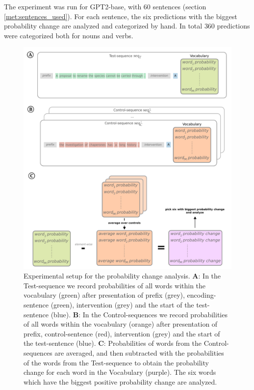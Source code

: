 The experiment was run for GPT2-base, with $60$ sentences (section \ref{met:sentences_used}).
For each sentence, the six predictions with the biggest probability change are analyzed and categorized by hand.
In total $360$ predictions were categorized both for nouns and verbs.

\begin{figure}
    \centering
    \includegraphics[width=\textwidth]{methods/prob_change_setup.pdf}
    \caption{Experimental setup for the probability change analysis. \textbf{A}: In the Test-sequence we record probabilities of all words within the vocabulary (green) after presentation of prefix (grey), encoding-sentence (green), intervention (grey) and the start of the test-sentence (blue). \textbf{B}: In the Control-sequences we record probabilities of all words within the vocabulary (orange) after presentation of prefix, control-sentence (red), intervention (grey) and the start of the test-sentence (blue). \textbf{C}: Probabilities of words from the Control-sequences are averaged, and then subtracted with the probabilities of the words from the Test-sequence to obtain the probability change for each word in the Vocabulary (purple). The six words which have the biggest positive probability change are analyzed.}
    \label{fig:prob_change_experiment}
\end{figure}

